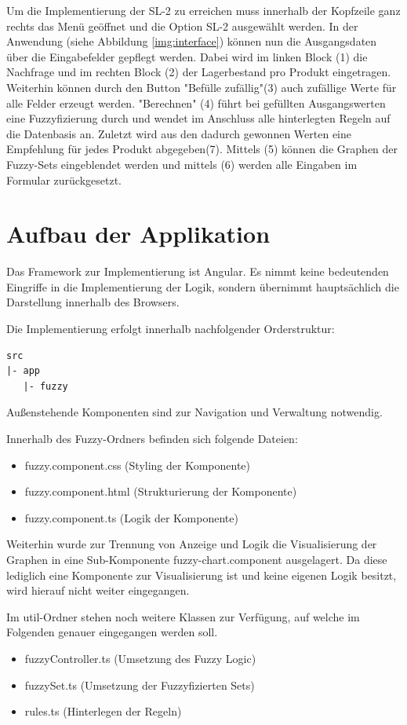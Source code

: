 \documentclass[]{scrartcl}
\begin{document}
Um die Implementierung der SL-2 zu erreichen muss innerhalb der Kopfzeile ganz rechts das Menü geöffnet und die Option SL-2 ausgewählt werden. In der Anwendung (siehe Abbildung \ref{img:interface}) können nun die Ausgangsdaten über die Eingabefelder gepflegt werden. Dabei wird im linken Block (1) die Nachfrage und im rechten Block (2) der Lagerbestand pro Produkt eingetragen. Weiterhin können durch den Button "Befülle zufällig"(3) auch zufällige Werte für alle Felder erzeugt werden. "Berechnen" (4) führt bei gefüllten Ausgangswerten eine Fuzzyfizierung durch und wendet im Anschluss alle hinterlegten Regeln auf die Datenbasis an. Zuletzt wird aus den dadurch gewonnen Werten eine Empfehlung für jedes Produkt abgegeben(7). Mittels (5) können die Graphen der Fuzzy-Sets eingeblendet werden und mittels (6) werden alle Eingaben im Formular zurückgesetzt.

\section{Aufbau der Applikation}
\label{aufbau}
Das Framework zur Implementierung ist Angular. Es nimmt keine bedeutenden Eingriffe in die Implementierung der Logik, sondern übernimmt hauptsächlich die Darstellung innerhalb des Browsers.


Die Implementierung erfolgt innerhalb nachfolgender Orderstruktur:
\begin{lstlisting}[backgroundcolor=\color{lightgray}]
src
|- app
   |- fuzzy
\end{lstlisting}
Außenstehende Komponenten sind zur Navigation und Verwaltung notwendig.

Innerhalb des Fuzzy-Ordners befinden sich folgende Dateien:
\begin{itemize}
\item fuzzy.component.css (Styling der Komponente)
\item fuzzy.component.html (Strukturierung der Komponente)
\item fuzzy.component.ts (Logik der Komponente)
\end{itemize}

Weiterhin wurde zur Trennung von Anzeige und Logik die Visualisierung der Graphen in eine Sub-Komponente fuzzy-chart.component ausgelagert. Da diese lediglich eine Komponente zur Visualisierung ist und keine eigenen Logik besitzt, wird hierauf nicht weiter eingegangen.

Im util-Ordner stehen noch weitere Klassen zur Verfügung, auf welche im Folgenden genauer eingegangen werden soll.
\begin{itemize}
	\item fuzzyController.ts (Umsetzung des Fuzzy Logic)
	\item fuzzySet.ts (Umsetzung der Fuzzyfizierten Sets)
	\item rules.ts (Hinterlegen der Regeln)
\end{itemize}
\end{document}
